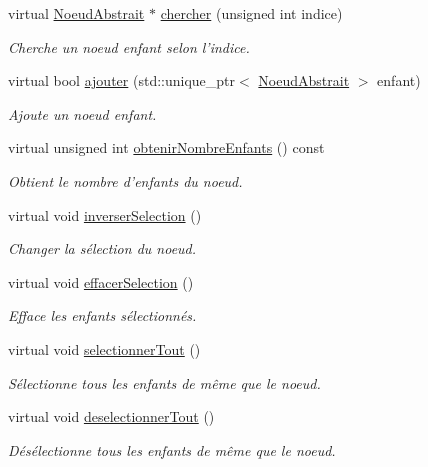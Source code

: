 \begin{DoxyCompactItemize}
virtual \hyperlink{class_noeud_abstrait}{Noeud\-Abstrait} $\ast$ \hyperlink{group__inf2990_ga13f7e9a637f7439b1a0cec0c49f6fa88}{chercher} (unsigned int indice)
\begin{DoxyCompactList}\small\item\em Cherche un noeud enfant selon l'indice. \end{DoxyCompactList}\item 
virtual bool \hyperlink{group__inf2990_ga7051399643afa57468ef07444a085a85}{ajouter} (std\-::unique\-\_\-ptr$<$ \hyperlink{class_noeud_abstrait}{Noeud\-Abstrait} $>$ enfant)
\begin{DoxyCompactList}\small\item\em Ajoute un noeud enfant. \end{DoxyCompactList}\item 
virtual unsigned int \hyperlink{group__inf2990_gad5a99959e905fc2d9f0fef16a02546a2}{obtenir\-Nombre\-Enfants} () const 
\begin{DoxyCompactList}\small\item\em Obtient le nombre d'enfants du noeud. \end{DoxyCompactList}\item 
virtual void \hyperlink{group__inf2990_ga2516eef94f98d4951baff6fd45020725}{inverser\-Selection} ()
\begin{DoxyCompactList}\small\item\em Changer la sélection du noeud. \end{DoxyCompactList}\item 
virtual void \hyperlink{group__inf2990_gaf6440c1b4ab6861f0ace6ba410c1fc84}{effacer\-Selection} ()
\begin{DoxyCompactList}\small\item\em Efface les enfants sélectionnés. \end{DoxyCompactList}\item 
virtual void \hyperlink{group__inf2990_gaa9b1fa06dad2695ea6870411c62652b3}{selectionner\-Tout} ()
\begin{DoxyCompactList}\small\item\em Sélectionne tous les enfants de même que le noeud. \end{DoxyCompactList}\item 
virtual void \hyperlink{group__inf2990_ga4f942bd122fc3402537ecac737c5248a}{deselectionner\-Tout} ()
\begin{DoxyCompactList}\small\item\em Désélectionne tous les enfants de même que le noeud. \end{DoxyCompactList}\item 

\end{DoxyCompactItemize}

